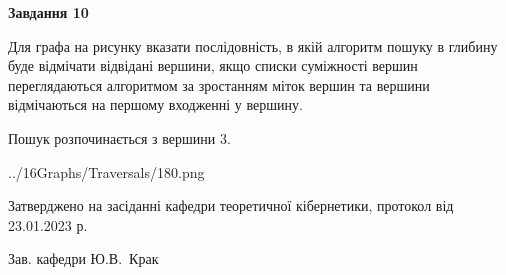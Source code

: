 \documentclass[12pt, ukrainian]{article}
\begin{document}
{\begin {large}
{\begin {center}\textbf{Завдання 10}\end {center}}\par
Для графа на рисунку вказати послідовність, в якій алгоритм пошуку в глибину буде відмічати відвідані вершини, якщо списки суміжності вершин переглядаються алгоритмом за зростанням міток вершин та вершини відмічаються на першому вход\-женні у вершину.\par
Пошук розпочинається з вершини 3.\par

\begin{center}
	{../16Graphs/Traversals/180.png}
\end{center}\par
\newpage


\end {large}
}
{\smallskip \begin {small} Затверджено на засіданні кафедри теоретичної кібернетики, протокол  від   23.01.2023 р.\par\smallskip\smallskip
{\parbox {6.5 cm}{Зав. кафедри \dotfill Ю.В.~Крак}} \end{small}}
\end{document}
